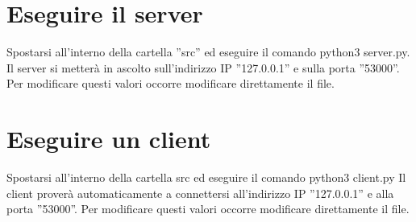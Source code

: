 \documentclass[a4paper,12pt]{report}
\begin{document}
\section{Eseguire il server}
Spostarsi all’interno della cartella ”src” ed eseguire il comando python3 server.py. Il server si metterà in ascolto sull'indirizzo IP ”127.0.0.1” e sulla porta ”53000”. Per modificare questi valori occorre modificare direttamente il file.

\section{Eseguire un client}
Spostarsi all’interno della cartella src ed eseguire il comando python3 client.py Il client proverà automaticamente a connettersi all’indirizzo IP ”127.0.0.1” e alla porta ”53000”. Per modificare questi valori occorre modificare
direttamente il file.
\end{document}
